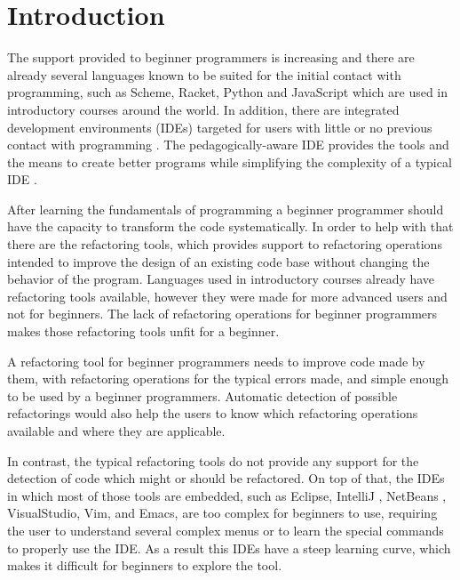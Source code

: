 \section{Introduction}

The support provided to beginner programmers is increasing and there are already
several languages known to be suited for the initial contact with programming, such as Scheme, Racket,
Python and JavaScript which are used in introductory courses around the world.
In addition, there are integrated development environments (IDEs) targeted for
 users with little or no previous contact with programming \cite{kolling2003bluej}. %
The pedagogically-aware %
 IDE provides the tools and the means to create better programs while simplifying
the complexity of a typical IDE \cite{pears2007survey}.%

After learning the fundamentals of programming a beginner programmer should have the
capacity to transform the code systematically.
In order to help with that there are the refactoring tools,
which provides support to refactoring operations intended to improve the design
of an existing code base \cite{fowler1999refactoring} without changing the behavior of the program.
Languages used in introductory courses already have refactoring tools available,
however they were made for more advanced users and not for beginners.
The lack of refactoring operations for beginner programmers makes those refactoring tools
unfit for a beginner.

A refactoring tool for beginner programmers needs to improve code made by them, %
with refactoring operations for the typical errors made, and simple enough to be
used by a beginner programmers.
Automatic detection of possible refactorings would also help the users to know
which refactoring operations available and where they are applicable.

In contrast, the typical refactoring tools do not provide any support for the detection of code which might or should 
be refactored.
On top of that, the IDEs in which most of those tools are embedded, such as Eclipse\cite{carlson2005eclipse},
 IntelliJ \cite{bock2011intellij}, NetBeans \cite{boudreau2002netbeans}, VisualStudio\cite{ford2011coding},
 Vim\cite{moolenaar2008vim}, and Emacs\cite{stallman2007gnu}, are too complex for beginners
 to use, requiring the user to understand several complex menus or to learn
 the special commands to properly use the IDE.
As a result this IDEs have a steep learning curve, which makes it difficult for beginners
to explore the tool. %

